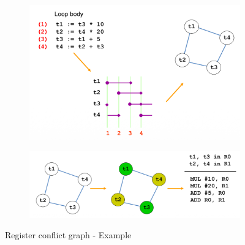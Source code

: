\begin{figure}[ht]
	\begin{center}
		\begin{subfigure}[b]{0.35\textwidth}
			\includegraphics[width=\textwidth]{images/Register_conflict_graph_1.png}
		\end{subfigure}
		\hfill
		\begin{subfigure}[b]{0.55\textwidth}
			\includegraphics[width=\textwidth]{images/Register_conflict_graph_2.png}			
		\end{subfigure}
		\caption{Register conflict graph - Example}
		\label{fig:register_conflict_graph}
	\end{center}
\end{figure}

